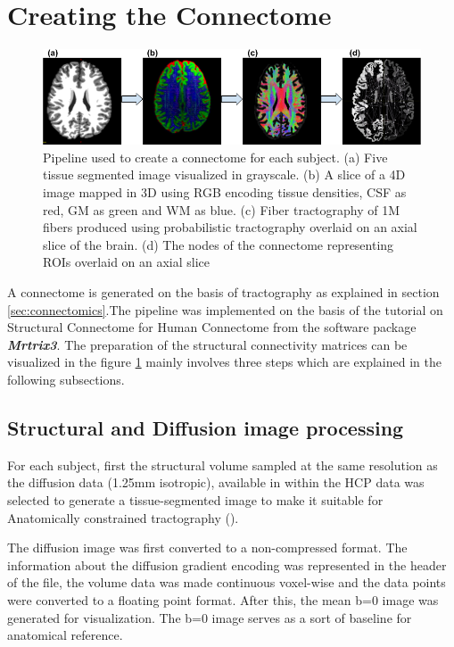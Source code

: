 \documentclass[msthesis.tex]{subfiles}
\begin{document}
 


\section{Creating the Connectome}
\begin{figure}
    \centering
    \includegraphics[width=\textwidth]{images/Preprocessing_pipeline.png}
    \caption{Pipeline used to create a connectome for each subject. (a) Five tissue segmented image visualized in grayscale. (b) A slice of a 4D image mapped in 3D using RGB encoding tissue densities, CSF as red, GM as green and WM as blue. (c) Fiber tractography of 1M fibers produced using probabilistic tractography overlaid on an axial slice of the brain. (d) The nodes of the connectome representing ROIs overlaid on an axial slice}
    \label{fig:preproc}
\end{figure}
A connectome is generated on the basis of tractography as explained in section \ref{sec:connectomics}.The pipeline was implemented on the basis of the tutorial on Structural Connectome for Human Connectome from the software package \textbf{\textit{Mrtrix3}}. The preparation of the structural connectivity matrices can be visualized in the figure \ref{fig:preproc} mainly involves three steps which are explained in the following subsections.

\subsection{Structural  and Diffusion image processing}
\label{subsec:struct_diff}
For each subject, first the structural volume sampled at the same resolution as the diffusion data (1.25mm isotropic), available in within the HCP data was selected to generate a tissue-segmented image to make it suitable for Anatomically constrained tractography (\cite{anattractsmith}).


The diffusion image was first converted to a non-compressed format. The information about the diffusion gradient encoding was represented in the header of the file, the volume data was made continuous voxel-wise and the data points were converted to a floating point format. 
After this, the mean b=0 image was generated for visualization. The b=0 image serves as a sort of baseline for anatomical reference.
\end{document}
